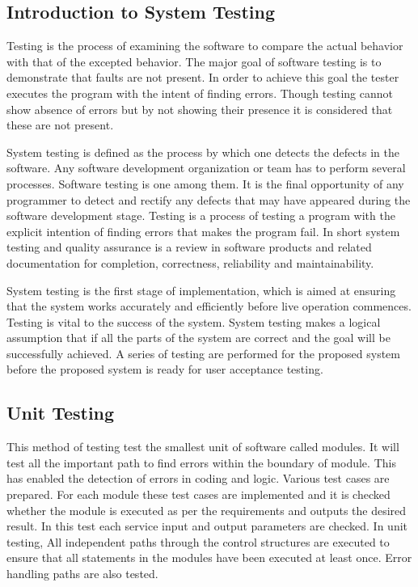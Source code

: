 \documentclass[a4paper,12pt]{article}
\begin{document}
\subsection{Introduction to System Testing}
\hspace{5mm}
Testing is the process of examining the software to compare the actual behavior with that of the excepted behavior. The major goal of software testing is to demonstrate that faults are not present. In order to achieve this goal the tester executes the program with the intent of finding errors. Though testing cannot show absence of errors but by not showing their presence it is considered that these are   not present. 
\vspace{5mm}\newline\par
System testing is defined as the process by which one detects the defects in the software. Any software development organization or team has to perform several processes. Software testing is one among them. It is the final opportunity of any programmer to detect and rectify any defects that may have appeared during the software development stage. Testing is a process of testing a program with the explicit intention of finding errors that makes the program fail. In short system testing  and quality assurance is a review  in software products and related documentation for completion, correctness, reliability  and maintainability.
\vspace{5mm}\newline\par
System testing is the first stage of implementation, which is aimed at ensuring that the system works accurately and efficiently before live operation commences. Testing is vital to the success of the system. System testing makes a logical assumption that if all the parts of the system are correct and the goal will be successfully achieved. A series of testing are performed for the proposed system before the proposed system is ready for user acceptance testing.
\newpage
\subsection{Unit Testing}  
\hspace{5mm} 
This method of testing test the smallest unit of software called modules. It will test all the important path to find errors within the boundary of module. This has enabled the detection of errors in coding and logic.
 Various test cases are prepared. For each module these test cases are implemented and it is checked whether the module is executed as per the requirements and outputs the desired result. In this test each service input and output parameters are checked. In unit testing, All independent paths through the control structures are executed to ensure that all statements in the modules have been executed at least once. Error handling paths are also tested.
\end{document}
